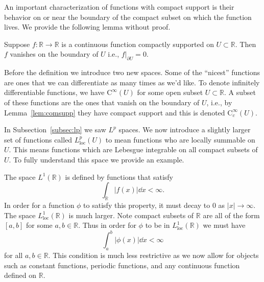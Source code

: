 An important characterization of functions with compact support is their
behavior on or near the boundary of the compact subset on which the function
lives. We provide the following lemma without proof.

\begin{lemma}\label{lem:comsupp}
    Suppose \(f:\mathbb{R}\to\mathbb{R}\) is a continuous function compactly
    supported on \(U\subset\mathbb{R}\). Then \(f\) vanishes on the boundary of
    \(U\) i.e., \(f|_{\partial U} = 0\).
\end{lemma}

Before the definition we introduce two new spaces. Some of the ``nicest''
functions are ones that we can differentiate as many times as we'd like. To
denote infinitely differentiable functions, we have \(\mathrm{C}^\infty(U)\) for
some open subset \(U\subset \mathbb{R}\). A subset of these functions are the
ones that vanish on the boundary of \(U\), i.e., by Lemma~\ref{lem:comsupp} they
have compact support and this is denoted \(\mathrm{C}_c^\infty(U)\).

In Subsection~\ref{subsec:lp} we saw \(L^p\) spaces. We now introduce a slightly
larger set of functions called \(L^p_\text{loc}(U)\) to mean functions who are
locally summable on \(U\). This means functions which are Lebesgue integrable on
all compact subsets of \(U\). To fully understand this space we provide an
example.

\begin{example}
    The space \(L^1(\mathbb{R})\) is defined by functions that satisfy
    \begin{equation*}
        \int_\mathbb{R}|f(x)|\dd{x} < \infty.
    \end{equation*}
    In order for a function \(\phi\) to satisfy this property, it must decay to
    0 as \(|x|\to\infty\). The space \(L^1_\text{loc}(\mathbb{R})\) is much
    larger. Note compact subsets of \(\mathbb{R}\) are all of the form \([a,b]\)
    for some \(a,b\in\mathbb{R}\). Thus in order for \(\phi\) to be in
    \(L^1_\text{loc}(\mathbb{R})\) we must have
    \begin{equation*}
        \int_a^b|\phi(x)|\dd{x} < \infty
    \end{equation*}
    for all \(a,b\in\mathbb{R}\). This condition is much less restrictive as we
    now allow for objects such as constant functions, periodic functions, and
    any continuous function defined on \(\mathbb{R}\).
\end{example}

